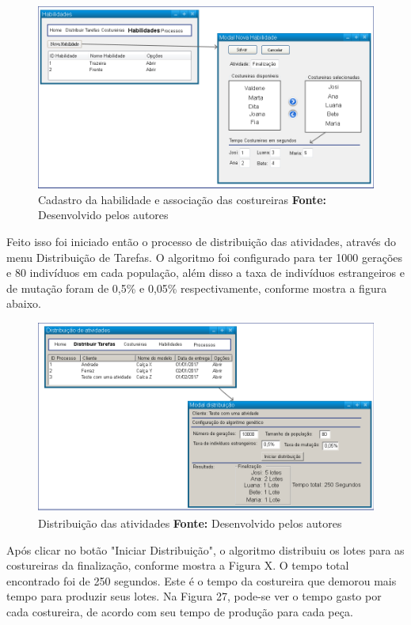 \begin{figure}[h!]
	\centerline{\includegraphics[scale=0.4]{./imagens/test_case_1_habilidades.png}}
	\caption[Caso de teste Habilidade]
	{Cadastro da habilidade e associação das costureiras \textbf{Fonte:} Desenvolvido pelos autores}
	\label{fig:exemplo1}
\end{figure}

\par Feito isso foi iniciado então o processo de distribuição das atividades, através do menu Distribuição de Tarefas.
O algoritmo foi configurado para ter 1000 gerações e 80 indivíduos em cada população, além disso a taxa de indivíduos
estrangeiros e de mutação foram de 0,5\% e 0,05\% respectivamente, conforme mostra a figura abaixo. 

\begin{figure}[h!]
	\centerline{\includegraphics[scale=0.4]{./imagens/test_case1_distribuicao.png}}
	\caption[Caso de teste Habilidade]
	{Distribuição das atividades \textbf{Fonte:} Desenvolvido pelos autores}
	\label{fig:exemplo1}
\end{figure}

\par Após clicar no botão "Iniciar Distribuição", o algoritmo distribuiu os lotes para as costureiras da finalização,
conforme mostra a Figura X. O tempo total encontrado foi de 250 segundos. Este é o tempo da costureira que demorou mais
tempo para produzir seus lotes. Na Figura 27, pode-se ver o tempo gasto por cada costureira, de acordo com seu tempo de
produção para cada peça.


